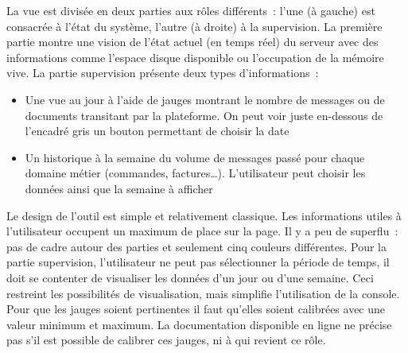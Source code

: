 			La vue est divisée en deux parties aux rôles
			différents~: l'une (à gauche) est consacrée à l’état du système, l'autre (à
			droite) à la supervision. La première partie montre une vision de l’état
			actuel (en temps réel) du serveur avec des informations comme l'espace
			disque disponible ou l'occupation de la mémoire vive.
			La partie supervision présente deux types d'informations~:
			\begin{itemize}
			  \item Une vue au jour à l’aide de jauges montrant le nombre de messages ou
			  de documents transitant par la plateforme. On peut voir juste en-dessous de
			  l’encadré gris un bouton permettant de choisir la date
			  \item Un historique à la semaine du volume de messages passé pour chaque
			  domaine métier (commandes, factures\ldots). L’utilisateur peut choisir les
			  données ainsi que la semaine à afficher
			\end{itemize}
			Le design de l’outil est simple et relativement classique. Les informations
			utiles à l’utilisateur occupent un maximum de place sur la page. Il y a peu
			de superflu~: pas de cadre autour des parties et seulement cinq couleurs différentes.\newline
			Pour la partie supervision, l’utilisateur ne peut pas sélectionner la
			période de temps, il doit se contenter de visualiser les données d’un jour
			ou d’une semaine. Ceci restreint les possibilités de
			visualisation, mais simplifie l’utilisation de la console.\newline
			Pour que les jauges soient pertinentes il faut qu’elles soient calibrées avec
			une valeur minimum et maximum. La documentation disponible en ligne ne précise
			pas s’il est possible de calibrer ces jauges, ni à qui revient ce rôle.
			
